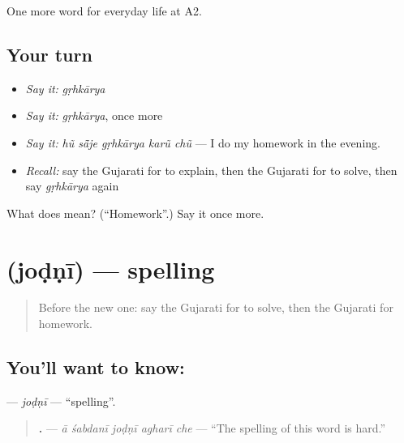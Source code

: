 \begin{grammarlens}[title={What you've built}]
One more word for everyday life at A2.
\end{grammarlens}

\subsection*{Your turn}
\begin{itemize}
\raggedright
  \item \emph{Say it:} \emph{gṛhkārya}
  \item \emph{Say it:} \emph{gṛhkārya}, once more
  \item \emph{Say it:} \emph{hũ sā̃je gṛhkārya karũ chũ} — I do my homework in the evening.
  \item \emph{Recall:} say the Gujarati for to explain, then the Gujarati for to solve, then say \emph{gṛhkārya} again
\end{itemize}

\begin{tcolorbox}[breakable,colback=teal!4,colframe=teal!35!black,title={Before you move on}]
What does  mean? (\textquotedblleft{}Homework\textquotedblright{}.) Say it once more.
\end{tcolorbox}
\section[\texorpdfstring{\gu{જોડણી} (joḍṇī)}{જોડણી (joḍṇī)}]{ (joḍṇī) — spelling}

\label{lesson:GU-C245-jodni}



\begin{quote}
Before the new one: say the Gujarati for to solve, then the Gujarati for homework.
\end{quote}

\subsection*{You'll want to know: }
\textbf{} — \emph{joḍṇī} — \textquotedblleft{}spelling\textquotedblright{}.

\begin{quote}
\textbf{    .} — \emph{ā śabdanī joḍṇī agharī che} — \textquotedblleft{}The spelling of this word is hard.\textquotedblright{}
\end{quote}


